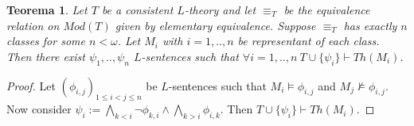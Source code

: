 \documentclass[11pt,a4paper]{article}
\newtheorem{theorem}{Teorema}
\theoremstyle{definition}
\theoremstyle{remark}
\begin{document}
\begin{theorem}

	Let $T$ be a consistent $L$-theory and let $\equiv_T$ be the equivalence relation on $Mod(T)$ given by elementary equivalence.
	Suppose $\equiv_T$ has exactly $n$ classes for some $n < \omega$.
	Let $M_i$ with $i = 1,..,n$ be representant of each class.
	Then there exist $\psi_1,..,\psi_n$ $L$-sentences such that $\forall i = 1,..,n \ T \cup \{ \psi_i \} \vdash Th(M_i)$.
  
\end{theorem}

\begin{proof}

	Let $(\phi_{i,j})_{1 \leq i < j \leq n}$ be $L$-sentences such that $M_i \models \phi_{i,j}$ and $M_j \not \models \phi_{i,j}$.
	Now consider $\psi_i := \bigwedge_{k < i} \neg \phi_{k,i} \land \bigwedge_{k >i} \phi_{i,k}$.
	Then $T \cup \{\psi_i\} \vdash Th(M_i)$.

\end{proof}
\end{document}

